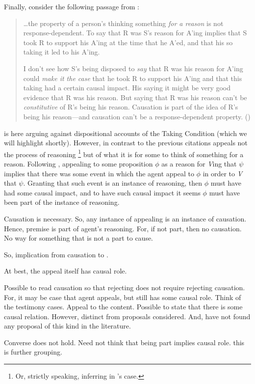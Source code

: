 \begin{note}
  Finally, consider the following passage from \citeauthor{Boghossian:2014aa}:
  \begin{quote}
    \dots the property of a person’s thinking something \emph{for a reason} is not response-dependent.
    To say that R was S's reason for A'ing implies that S took R to support his A'ing at the time that he A'ed, and that his so taking it led to his A'ing.

    I don't see how S's being disposed to \emph{say} that R was his reason for A'ing could \emph{make it the case} that he took R to support his A'ing and that this taking had a certain causal impact.
    His saying it might be very good evidence that R was his reason.
    But saying that R was his reason can’t be \emph{constitutive} of R's being his reason.
    Causation is part of the idea of R's being his reason---and causation can't be a response-dependent property.\nolinebreak
    \mbox{}\hfill\mbox{(\citeyear[10--11]{Boghossian:2014aa})}
  \end{quote}
  \citeauthor{Boghossian:2014aa} is here arguing against dispositional accounts of the Taking Condition (which we will highlight shortly).
  However, in contrast to the previous citations \citeauthor{Boghossian:2014aa} appeals not the process of reasoning\nolinebreak
  \footnote{
    Or, strictly speaking, inferring in \citeauthor{Boghossian:2014aa}'s case.
  }
  but of what it is for some to think of something for a reason.
  Following \citeauthor{Boghossian:2014aa}, appealing to some proposition \(\phi\) as a reason for \emph{V}ing that \(\psi\) implies that there was some event in which the agent appeal to \(\phi\) in order to \emph{V} that \(\psi\).
  Granting that such event is an instance of reasoning, then \(\phi\) must have had some causal impact, and to have such causal impact it seems \(\phi\) must have been part of the instance of reasoning.
\end{note}

\begin{note}
  Causation is necessary.
  So, any instance of appealing is an instance of causation.
  Hence, premise is part of agent's reasoning.
  For, if not part, then no causation.
  No way for something that is not a part to cause.

  So, implication from causation to \ESU{}.

  At best, the appeal itself has causal role.

  Possible to read causation so that rejecting \ESU{} does not require rejecting causation.
  For, it may be case that agent appeals, but still has some causal role.
  Think of the testimony cases.
  Appeal to the content.
  Possible to state that there is some causal relation.
  However, distinct from proposals considered.
  And, have not found any proposal of this kind in the literature.

  Converse does not hold.
  Need not think that being part implies causal role.
  {\color{red} this is further grouping}.
\end{note}

